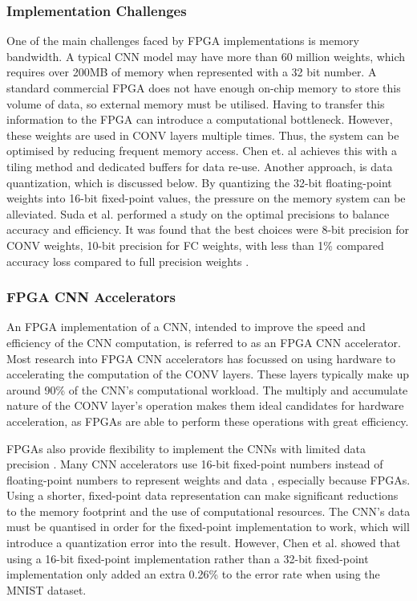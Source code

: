 \documentclass[12pt]{article}
\begin{document}
\subsubsection{Implementation Challenges}
\label{sec:Background-FpgaCnnImpl-Challenges}
\vspace{-12pt}

One of the main challenges faced by FPGA implementations is memory bandwidth. A typical CNN model may have more than 60 million weights, which requires over 200MB of memory when represented with a 32 bit number. A standard commercial FPGA does not have enough on-chip memory to store this volume of data, so external memory must be utilised. Having to transfer this information to the FPGA can introduce a computational bottleneck. However, these weights are used in CONV layers multiple times. Thus, the system can be optimised by reducing frequent memory access. Chen et. al achieves this with a tiling method and dedicated buffers for data re-use. Another approach, is data quantization, which is discussed below. By quantizing the 32-bit floating-point weights into 16-bit fixed-point values, the pressure on the memory system can be alleviated. Suda et al. performed a study on the optimal precisions to balance accuracy and efficiency. It was found that the best choices were 8-bit precision for CONV weights, 10-bit precision for FC weights, with less than 1\% compared accuracy loss compared to full precision weights \cite{SudaFpgaAccelerator}.

\subsubsection{FPGA CNN Accelerators}
\label{sec:Background-FpgaCnnImpl-Accel}
\vspace{-12pt}

An FPGA implementation of a CNN, intended to improve the speed and efficiency of the CNN computation, is referred to as an FPGA CNN accelerator. Most research into FPGA CNN accelerators has focussed on using hardware to accelerating the computation of the CONV layers. These layers typically make up around 90\% of the CNN's computational workload. The multiply and accumulate nature of the CONV layer's operation makes them ideal candidates for hardware acceleration, as FPGAs are able to perform these operations with great efficiency. 

FPGAs also provide flexibility to implement the CNNs with limited data precision \cite{SudaFpgaAccelerator}. Many CNN accelerators use 16-bit fixed-point numbers instead of floating-point numbers to represent weights and data \cite{ZhangFpgaAccelerator}\cite{ChenFpgaAccelerator}\cite{FarabetFpgaAccelerator}, especially because FPGAs. Using a shorter, fixed-point data representation can make significant reductions to the memory footprint and the use of computational resources. The CNN's data must be quantised in order for the fixed-point implementation to work, which will introduce a quantization error into the result. However, Chen et al. showed that using a 16-bit fixed-point implementation rather than a 32-bit fixed-point implementation only added an extra 0.26\% to the error rate when using the MNIST dataset.
\end{document}
